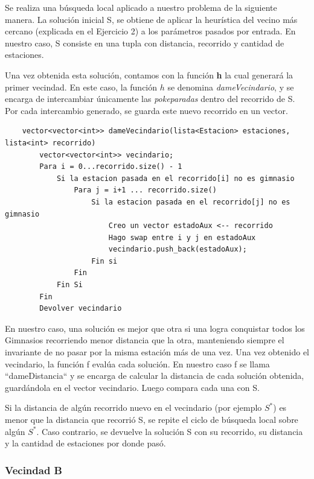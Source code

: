     \par Se realiza una búsqueda local aplicado a nuestro problema de la siguiente manera. La solución inicial S, se obtiene de aplicar la heurística del vecino más cercano (explicada en el Ejercicio 2) a los parámetros pasados por entrada. En nuestro caso, S consiste en una tupla con distancia, recorrido y cantidad de estaciones.
    \par Una vez obtenida esta solución, contamos con la función \textbf{h} la cual generará la primer vecindad. En este caso, la función $h$ se denomina \emph{dameVecindario}, y se encarga de intercambiar únicamente las \emph{pokeparadas} dentro del recorrido de S. Por cada intercambio generado, se guarda este nuevo recorrido en un vector.

    \begin{codesnippet}
    \begin{verbatim}
    vector<vector<int>> dameVecindario(lista<Estacion> estaciones, lista<int> recorrido)
        vector<vector<int>> vecindario;
        Para i = 0...recorrido.size() - 1
            Si la estacion pasada en el recorrido[i] no es gimnasio
                Para j = i+1 ... recorrido.size()
                    Si la estacion pasada en el recorrido[j] no es gimnasio
                        Creo un vector estadoAux <-- recorrido
                        Hago swap entre i y j en estadoAux
                        vecindario.push_back(estadoAux);
                    Fin si
                Fin
            Fin Si
        Fin
        Devolver vecindario
    \end{verbatim}
    \end{codesnippet}

    En nuestro caso, una solución es mejor que otra si una logra conquistar todos los Gimnasios recorriendo menor distancia que la otra, manteniendo siempre el invariante de no pasar por la misma estación más de una vez. 
    Una vez obtenido el vecindario, la función f evalúa cada solución. En nuestro caso f se llama “dameDistancia“ y se encarga de calcular la distancia de cada solución obtenida, guardándola en el vector vecindario. Luego compara cada una con S. 
    \par Si la distancia de algún recorrido nuevo en el vecindario (por ejemplo $S^{*}$) es menor que la distancia que recorrió S, se repite el ciclo de búsqueda local sobre algún $S^{*}$. Caso contrario, se devuelve la solución S con su recorrido, su distancia y la cantidad de estaciones por donde pasó.

   \subsubsection{Vecindad B}


